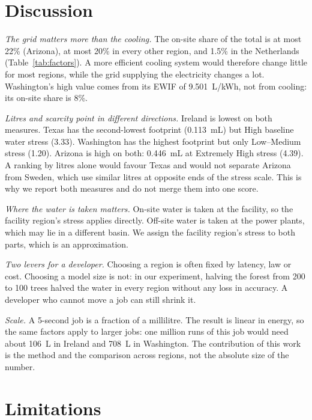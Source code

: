 \documentclass[conference]{IEEEtran}
\begin{document}
\section{Discussion}

\textit{The grid matters more than the cooling.} The on-site share of the total is at most 22\% (Arizona), at most 20\% in every other region, and 1.5\% in the Netherlands (Table~\ref{tab:factors}). A more efficient cooling system would therefore change little for most regions, while the grid supplying the electricity changes a lot. Washington's high value comes from its EWIF of 9.501~L/kWh, not from cooling: its on-site share is 8\%.

\textit{Litres and scarcity point in different directions.} Ireland is lowest on both measures. Texas has the second-lowest footprint (0.113~mL) but High baseline water stress (3.33). Washington has the highest footprint but only Low--Medium stress (1.20). Arizona is high on both: 0.446~mL at Extremely High stress (4.39). A ranking by litres alone would favour Texas and would not separate Arizona from Sweden, which use similar litres at opposite ends of the stress scale. This is why we report both measures and do not merge them into one score.

\textit{Where the water is taken matters.} On-site water is taken at the facility, so the facility region's stress applies directly. Off-site water is taken at the power plants, which may lie in a different basin. We assign the facility region's stress to both parts, which is an approximation.

\textit{Two levers for a developer.} Choosing a region is often fixed by latency, law or cost. Choosing a model size is not: in our experiment, halving the forest from 200 to 100 trees halved the water in every region without any loss in accuracy. A developer who cannot move a job can still shrink it.

\textit{Scale.} A 5-second job is a fraction of a millilitre. The result is linear in energy, so the same factors apply to larger jobs: one million runs of this job would need about 106~L in Ireland and 708~L in Washington. The contribution of this work is the method and the comparison across regions, not the absolute size of the number.

\section{Limitations}
\end{document}
